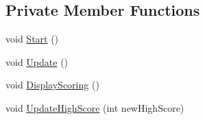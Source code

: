 \subsection*{Private Member Functions}
\begin{DoxyCompactItemize}
\item 
void \mbox{\hyperlink{class_death_menu_controller_aa8c8ff46b0b6bcf6da673070dfc7bd7c}{Start}} ()
\item 
void \mbox{\hyperlink{class_death_menu_controller_a943f3a722a71c30234d311ac43753b90}{Update}} ()
\item 
void \mbox{\hyperlink{class_death_menu_controller_adbe8df3edb511db4b9b37b21a2961aeb}{Display\+Scoring}} ()
\item 
void \mbox{\hyperlink{class_death_menu_controller_a0b02d106621a75f2c581662002f8b2fa}{Update\+High\+Score}} (int new\+High\+Score)
\end{DoxyCompactItemize}
